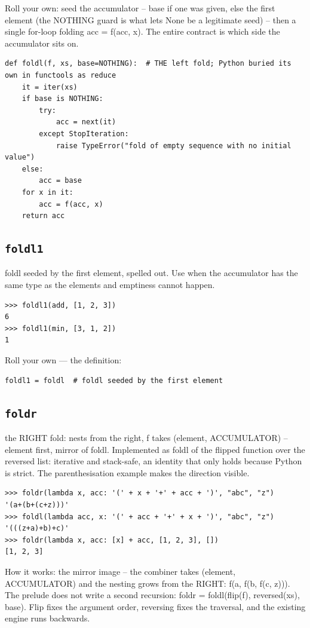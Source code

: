 \documentclass[10pt,letterpaper]{book}
\begin{document}
Roll your own: seed the accumulator -- base if one was given, else the first element (the NOTHING guard is what lets None be a legitimate seed) -- then a single for-loop folding acc = f(acc, x). The entire contract is which side the accumulator sits on.

\begin{lstlisting}[style=ex]
def foldl(f, xs, base=NOTHING):  # THE left fold; Python buried its own in functools as reduce
    it = iter(xs)
    if base is NOTHING:
        try:
            acc = next(it)
        except StopIteration:
            raise TypeError("fold of empty sequence with no initial value")
    else:
        acc = base
    for x in it:
        acc = f(acc, x)
    return acc
\end{lstlisting}
\subsection{\texttt{foldl1}}\label{def:foldl1}
foldl seeded by the first element, spelled out. Use when the accumulator has the same type as the elements and emptiness cannot happen.
\begin{lstlisting}[style=ex]
>>> foldl1(add, [1, 2, 3])
6
>>> foldl1(min, [3, 1, 2])
1
\end{lstlisting}

Roll your own --- the definition:

\begin{lstlisting}[style=ex]
foldl1 = foldl  # foldl seeded by the first element
\end{lstlisting}
\subsection{\texttt{foldr}}\label{def:foldr}
the RIGHT fold: nests from the right, f takes (element, ACCUMULATOR) -- element first, mirror of foldl. Implemented as foldl of the flipped function over the reversed list: iterative and stack-safe, an identity that only holds because Python is strict. The parenthesisation example makes the direction visible.
\begin{lstlisting}[style=ex]
>>> foldr(lambda x, acc: '(' + x + '+' + acc + ')', "abc", "z")
'(a+(b+(c+z)))'
>>> foldl(lambda acc, x: '(' + acc + '+' + x + ')', "abc", "z")
'(((z+a)+b)+c)'
>>> foldr(lambda x, acc: [x] + acc, [1, 2, 3], [])
[1, 2, 3]
\end{lstlisting}

How it works: the mirror image -- the combiner takes (element, ACCUMULATOR) and the nesting grows from the RIGHT: f(a, f(b, f(c, z))). The prelude does not write a second recursion: foldr = foldl(flip(f), reversed(xs), base). Flip fixes the argument order, reversing fixes the traversal, and the existing engine runs backwards.
\end{document}
